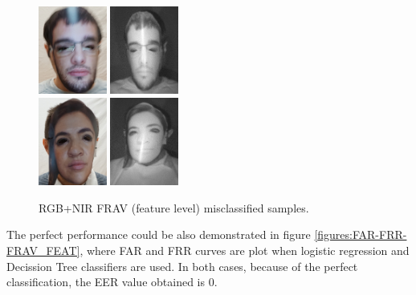 \begin{figure}[htb]
\centering
\includegraphics[width=0.2\textwidth]{images_databases/frav_rgb_151.JPG}
\includegraphics[width=0.2\textwidth]{images_databases/frav_nir_151.jpg}
\\
\includegraphics[width=0.2\textwidth]{images_databases/frav_rgb_128.JPG}
\includegraphics[width=0.2\textwidth]{images_databases/frav_nir_128.jpg}
\caption{RGB+NIR FRAV (feature level) misclassified samples.} \label{fig:frav_feat_miscl}
\end{figure}

The perfect performance could be also demonstrated in figure \ref{figures:FAR-FRR-FRAV_FEAT}, where FAR and FRR curves are plot when logistic regression and Decission Tree classifiers are used. In both cases, because of the perfect classification, the EER value obtained is 0.

